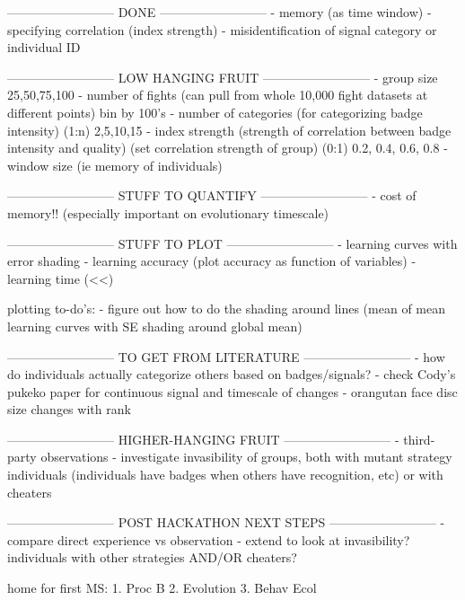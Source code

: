 --------------------------
DONE
--------------------------
- memory (as time window)
- specifying correlation (index strength)
- misidentification of signal category or individual ID


--------------------------
LOW HANGING FRUIT
--------------------------
- group size {25,50,75,100}
- number of fights (can pull from whole 10,000 fight datasets at different points) {bin by 100's}
- number of categories (for categorizing badge intensity) (1:n) {2,5,10,15}
- index strength (strength of correlation between badge intensity and quality) (set correlation strength of group) (0:1) {0.2, 0.4, 0.6, 0.8}
- window size (ie memory of individuals)

--------------------------
STUFF TO QUANTIFY
--------------------------
- cost of memory!! (especially important on evolutionary timescale)

--------------------------
STUFF TO PLOT
--------------------------
- learning curves with error shading
- learning accuracy (plot accuracy as function of variables)
- learning time (<<)

plotting to-do's:
- figure out how to do the shading around lines (mean of mean learning curves with SE shading around global mean)


--------------------------
TO GET FROM LITERATURE
--------------------------
- how do individuals actually categorize others based on badges/signals?
- check Cody's pukeko paper for continuous signal and timescale of changes
- orangutan face disc size changes with rank


--------------------------
HIGHER-HANGING FRUIT
--------------------------
- third-party observations
- investigate invasibility of groups, both with mutant strategy individuals (individuals have badges when others have recognition, etc) or with cheaters


--------------------------
POST HACKATHON NEXT STEPS
--------------------------
- compare direct experience vs observation
- extend to look at invasibility? individuals with other strategies AND/OR cheaters?

home for first MS:
1. Proc B
2. Evolution
3. Behav Ecol


